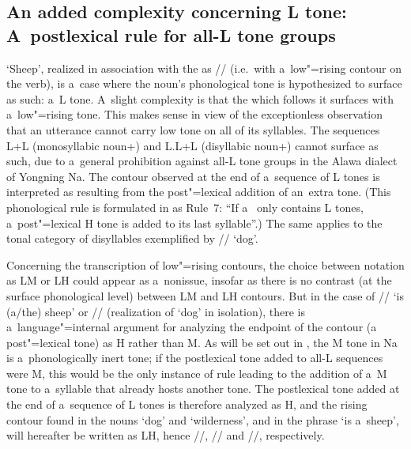 \subsection[A~postlexical rule for all-L tone groups]{An added complexity concerning L tone: A~postlexical rule for all-L tone groups}
\label{sec:ltonesexistenceofarepairphenomenonforallltonegroups}

‘Sheep’, realized in association with the  as // (i.e.\ with a~low"=rising contour on
the verb), is a~case where the noun’s phonological tone is hypothesized to surface as such: a~L
tone. A~slight complexity is that the  which follows it surfaces with a~low"=rising tone. This makes sense in
view of the exceptionless observation that an utterance cannot carry low tone on all of its
syllables. The sequences L+L (monosyllabic noun+) and L.L+L (disyllabic noun+) cannot
surface as such, due to a~general prohibition against all-L tone groups in the Alawa dialect of Yongning Na. The contour observed
at the end of a~sequence of L tones is interpreted as resulting from the post"=lexical addition of
an~extra tone. (This phonological rule is formulated in  as Rule~7: “If a~ only contains L tones, a~post"=lexical H tone is added to its last syllable”.) The same applies to the tonal category of disyllables exemplified by // ‘dog’.

Concerning the transcription of low"=rising contours, the choice between notation as LM or LH could
appear as a~nonissue, insofar as there is no contrast (at the surface phonological level) between LM
and LH contours. But in the case of // ‘is \mbox{(a/the)} sheep’ or // (realization of
‘dog’ in isolation), there is a~language"=internal argument for analyzing the endpoint of the
contour (a post"=lexical tone) as H rather than M. As will be set out in , the M tone in
Na is a~phonologically inert tone; if the postlexical tone added to all-L sequences were M, this
would be the only instance of rule leading to the addition of a~M tone to a~syllable that already hosts another tone. The postlexical tone added at the end of a~sequence of L tones is
therefore analyzed as H, and the rising contour found in the nouns ‘dog’ and ‘wilderness’, and in the phrase ‘is a~sheep’,
will hereafter be written as LH, hence //, // and //, respectively.

